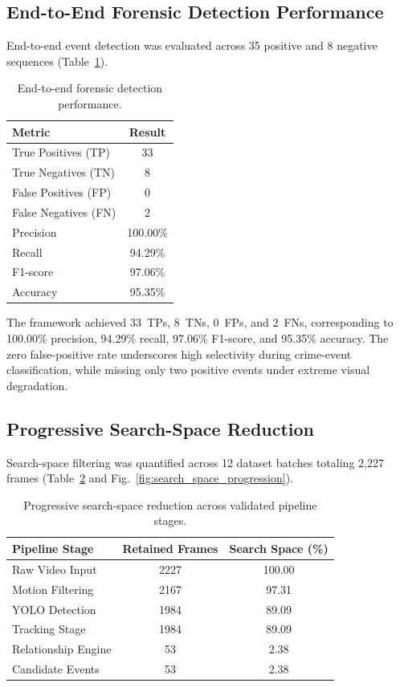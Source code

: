 \subsection{End-to-End Forensic Detection Performance}

End-to-end event detection was evaluated across 35 positive and 8 negative sequences (Table~\ref{tab:end_to_end_performance}).

\begin{table}[htbp]
\centering
\caption{End-to-end forensic detection performance.}
\label{tab:end_to_end_performance}
\scriptsize
\renewcommand{\arraystretch}{1.0}
\begin{tabular}{lc}
\hline
\textbf{Metric} & \textbf{Result} \\
\hline
True Positives (TP) & 33 \\
True Negatives (TN) & 8 \\
False Positives (FP) & 0 \\
False Negatives (FN) & 2 \\
Precision & 100.00\% \\
Recall & 94.29\% \\
F1-score & 97.06\% \\
Accuracy & 95.35\% \\
\hline
\end{tabular}
\end{table}

The framework achieved 33~TPs, 8~TNs, 0~FPs, and 2~FNs, corresponding to 100.00\% precision, 94.29\% recall, 97.06\% F1-score, and 95.35\% accuracy. The zero false-positive rate underscores high selectivity during crime-event classification, while missing only two positive events under extreme visual degradation.

\subsection{Progressive Search-Space Reduction}

Search-space filtering was quantified across 12 dataset batches totaling 2,227 frames (Table~\ref{tab:progressive_reduction} and Fig.~\ref{fig:search_space_progression}).

\begin{table}[htbp]
\centering
\scriptsize
\setlength{\tabcolsep}{5pt}
\renewcommand{\arraystretch}{1.0}
\caption{Progressive search-space reduction across validated pipeline stages.}
\label{tab:progressive_reduction}
\begin{tabular}{lcc}
\hline
\textbf{Pipeline Stage} & \textbf{Retained Frames} & \textbf{Search Space (\%)} \\
\hline
Raw Video Input   & 2227 & 100.00 \\
Motion Filtering  & 2167 & 97.31 \\
YOLO Detection    & 1984 & 89.09 \\
Tracking Stage    & 1984 & 89.09 \\
Relationship Engine & 53 & 2.38 \\
Candidate Events  & 53 & 2.38 \\
\hline
\end{tabular}
\end{table}

